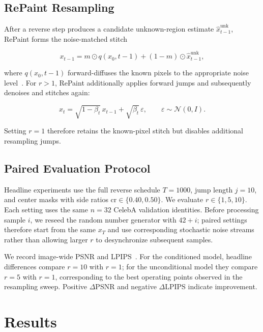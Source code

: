 \documentclass{article}
\begin{document}
\subsection{RePaint Resampling}

After a reverse step produces a candidate unknown-region estimate
$\hat{x}_{t-1}^{\mathrm{unk}}$, RePaint forms the noise-matched stitch

\begin{equation}
x_{t-1}
=
m\odot q(x_0,t{-}1)
+
(1-m)\odot\hat{x}_{t-1}^{\mathrm{unk}},
\label{eq:stitch}
\end{equation}

where $q(x_0,t{-}1)$ forward-diffuses the known pixels to the appropriate noise
level~\cite{lugmayr2022repaint}.
For $r>1$, RePaint additionally applies forward jumps and subsequently
denoises and stitches again:

\begin{equation}
x_t=
\sqrt{1-\beta_t}\,x_{t-1}
+
\sqrt{\beta_t}\,\varepsilon,
\qquad
\varepsilon\sim\mathcal{N}(0,I).
\label{eq:jump}
\end{equation}

Setting $r{=}1$ therefore retains the known-pixel stitch but disables additional
resampling jumps.

\subsection{Paired Evaluation Protocol}

Headline experiments use the full reverse schedule $T{=}1000$, jump length
$j{=}10$, and center masks with side ratios
$\mathrm{cr}\in\{0.40,0.50\}$.
We evaluate $r\in\{1,5,10\}$.
Each setting uses the same $n{=}32$ CelebA validation identities.
Before processing sample $i$, we reseed the random number generator with
$42+i$; paired settings therefore start from the same $x_T$ and use
corresponding stochastic noise streams rather than allowing larger $r$ to
desynchronize subsequent samples.

We record image-wide PSNR and LPIPS~\cite{zhang2018lpips}.
For the conditioned model, headline differences compare $r{=}10$ with $r{=}1$;
for the unconditional model they compare $r{=}5$ with $r{=}1$, corresponding
to the best operating points observed in the resampling sweep.
Positive $\Delta$PSNR and negative $\Delta$LPIPS indicate improvement.


\section{Results}
\label{sec:results}
\end{document}
